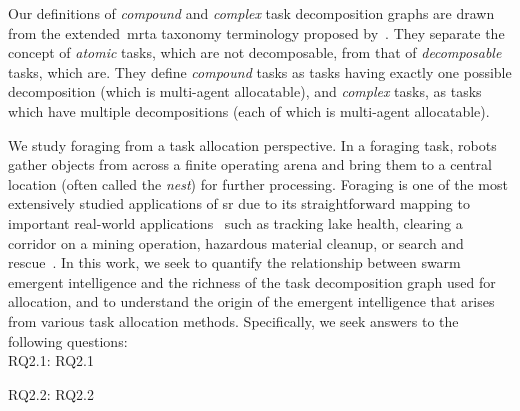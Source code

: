 %
Our definitions of \emph{compound} and \emph{complex} task decomposition graphs
are drawn from the extended~\gls{mrta} taxonomy terminology proposed
by~\cite{Korsah2013}. They separate the concept of \emph{atomic} tasks, which
are not decomposable, from that of \emph{decomposable} tasks, which are. They
define \emph{compound} tasks as tasks having exactly one possible decomposition
(which is multi-agent allocatable), and \emph{complex} tasks, as tasks which
have multiple decompositions (each of which is multi-agent allocatable).


We study foraging from a task allocation perspective. In a foraging task, robots
gather objects from across a finite operating arena and bring them to a central
location (often called the \emph{nest}) for further processing. Foraging is one
of the most extensively studied applications of \gls{sr} due to its
straightforward mapping to important real-world applications~\cite{Hecker2015}
such as tracking lake health, clearing a corridor on a mining operation,
hazardous material cleanup, or search and
rescue~\cite{Sahin2005,Hecker2015,Labella}. In this work, we seek to quantify
the relationship between swarm emergent intelligence and the richness of the
task decomposition graph used for allocation, and to understand the origin of
the emergent intelligence that arises from various task allocation
methods. Specifically, we seek
answers to the following questions:\\[-3ex]
%
\noindent
\gls{RQ2.1}: \glsdesc{RQ2.1}

\noindent
\gls{RQ2.2}: \glsdesc{RQ2.2}




